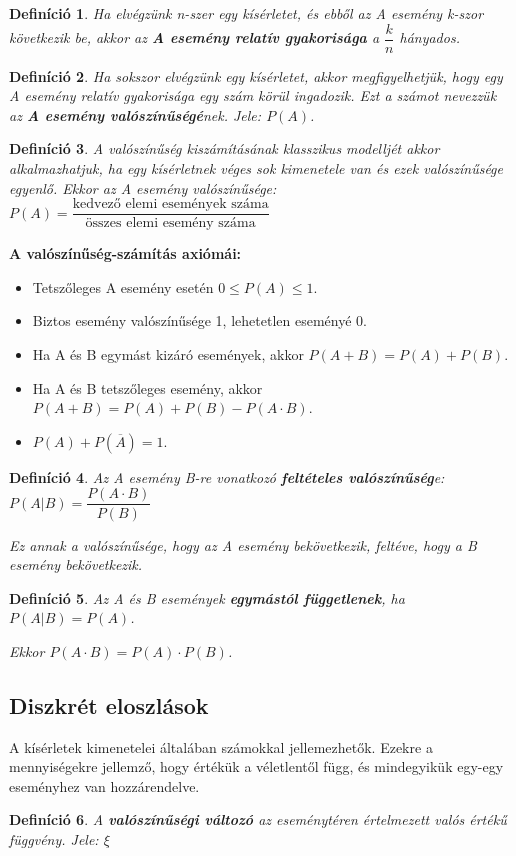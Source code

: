 \documentclass[12pt,a4paper]{article}
\newtheorem{definition}{Definíció} [section]
\begin{document}
\begin{definition}
Ha elvégzünk n-szer egy kísérletet, és ebből az A esemény k-szor következik be, akkor
az \textbf{A esemény relatív gyakorisága} a $\dfrac{k}{n}$ hányados.
\end{definition}

\begin{definition}
Ha sokszor elvégzünk egy kísérletet, akkor megfigyelhetjük, hogy egy A esemény relatív gyakorisága egy szám körül ingadozik. Ezt a számot nevezzük az \textbf{A esemény valószínűségé}nek. Jele: $P(A)$.
\end{definition}

\begin{definition}
A valószínűség kiszámításának klasszikus modelljét akkor alkalmazhatjuk, ha egy kísérletnek véges sok kimenetele van és ezek valószínűsége egyenlő. Ekkor az A esemény valószínűsége: $P(A)=\dfrac{\text{kedvező elemi események száma}}{\text{összes elemi esemény száma}}$
\end{definition}

\textbf{A valószínűség-számítás axiómái:}
\begin{itemize}
\item Tetszőleges A esemény esetén $0\leq P(A)\leq 1$.
\item Biztos esemény valószínűsége 1, lehetetlen eseményé 0.
\item Ha A és B egymást kizáró események, akkor $P(A+B)=P(A)+P(B)$.
\item  Ha A és B tetszőleges esemény, akkor $P(A+B)=P(A)+P(B)-P(A\cdot B)$.
\item $P(A)+P(\overline{A})=1$.
\end{itemize}

\begin{definition}
Az A esemény B-re vonatkozó \textbf{feltételes valószínűség}e: $P(A|B)=\dfrac{P(A\cdot B)}{P(B)}$

Ez annak a valószínűsége, hogy az A esemény bekövetkezik, feltéve, hogy a B esemény bekövetkezik.
\end{definition}

\begin{definition}
Az A és B események \textbf{egymástól függetlenek}, ha $P(A|B)=P(A)$.

Ekkor $P(A\cdot B)=P(A)\cdot P(B)$.
\end{definition}

\subsection{Diszkrét eloszlások}
A kísérletek kimenetelei általában számokkal jellemezhetők. Ezekre a mennyiségekre jellemző, hogy értékük a véletlentől függ, és mindegyikük egy-egy eseményhez van hozzárendelve.
\begin{definition}
A \textbf{valószínűségi változó} az eseménytéren értelmezett valós értékű függvény. Jele: $\xi$
\end{definition}
\end{document}
